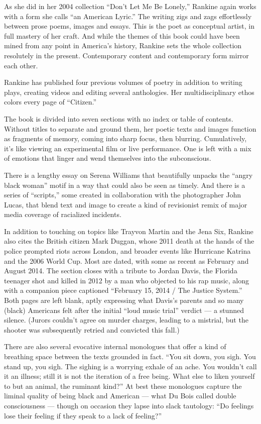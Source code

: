 As she did in her 2004 collection ``Don't Let Me Be Lonely,'' Rankine
again works with a form she calls ``an American Lyric.'' The writing
zigs and zags effortlessly between prose poems, images and essays. This
is the poet as conceptual artist, in full mastery of her craft. And
while the themes of this book could have been mined from any point in
America's history, Rankine sets the whole collection resolutely in the
present. Contemporary content and contemporary form mirror each other.

Rankine has published four previous volumes of poetry in addition to
writing plays, creating videos and editing several anthologies. Her
multidisciplinary ethos colors every page of ``Citizen.''

The book is divided into seven sections with no index or table of
contents. Without titles to separate and ground them, her poetic texts
and images function as fragments of memory, coming into sharp focus,
then blurring. Cumulatively, it's like viewing an experimental film or
live performance. One is left with a mix of emotions that linger and
wend themselves into the subconscious.

There is a lengthy essay on Serena Williams that beautifully unpacks the
``angry black woman'' motif in a way that could also be seen as timely.
And there is a series of ``scripts,'' some created in collaboration with
the photographer John Lucas, that blend text and image to create a kind
of revisionist remix of major media coverage of racialized incidents.

In addition to touching on topics like Trayvon Martin and the Jena Six,
Rankine also cites the British citizen Mark Duggan, whose 2011 death at
the hands of the police prompted riots across London, and broader events
like Hurricane Katrina and the 2006 World Cup. Most are dated, with some
as recent as February and August 2014. The section closes with a tribute
to Jordan Davis, the Florida teenager shot and killed in 2012 by a man
who objected to his rap music, along with a companion piece captioned
``February 15, 2014 / The Justice System.'' Both pages are left blank,
aptly expressing what Davis's parents and so many (black) Americans felt
after the initial ``loud music trial'' verdict --- a stunned silence.
(Jurors couldn't agree on murder charges, leading to a mistrial, but the
shooter was subsequently retried and convicted this fall.)

There are also several evocative internal monologues that offer a kind
of breathing space between the texts grounded in fact. ``You sit down,
you sigh. You stand up, you sigh. The sighing is a worrying exhale of an
ache. You wouldn't call it an illness; still it is not the iteration of
a free being. What else to liken yourself to but an animal, the ruminant
kind?'' At best these monologues capture the liminal quality of being
black and American --- what Du Bois called double consciousness ---
though on occasion they lapse into slack tautology: ``Do feelings lose
their feeling if they speak to a lack of feeling?''

